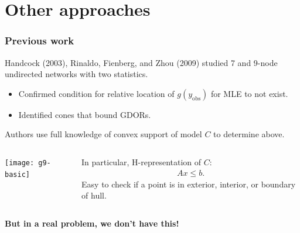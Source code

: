 \documentclass[ 10pt]{beamer}
\newcommand{\yobs}{y_{\text{obs}}}
\begin{document}
\section{Other approaches}
\frame
{
  \frametitle{Previous work}  
Handcock (2003), Rinaldo, Fienberg, and Zhou (2009) studied 7 and 9-node undirected networks
with two statistics.
\begin{itemize}
	\item Confirmed condition for relative location of $g(\yobs)$ for MLE to not exist.  
	\item Identified cones that bound GDORs.%
\end{itemize}
\pause
Authors use full knowledge of convex support of model $C$ to determine above.

\begin{columns}[]
\begin{column}[T]{0.4\textwidth}
\texttt{[image: g9-basic]}
\end{column}

\begin{column}[t]{0.6\textwidth}

In particular, H-representation of $C$:
\begin{align*}
	Ax \leq b.
\end{align*}
Easy to check if a point is in exterior, interior, or boundary of hull.

\end{column}
\end{columns}

\pause
\textbf{But in a real problem, we don't have this!}

}

\end{document}
